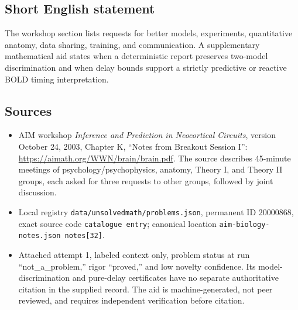 \documentclass[11pt]{article}
\begin{document}
\subsection{Short English statement}
The workshop section lists requests for better models, experiments, quantitative anatomy, data sharing, training, and communication. A supplementary mathematical aid states when a deterministic report preserves two-model discrimination and when delay bounds support a strictly predictive or reactive BOLD timing interpretation.
\subsection{Sources}
\begin{itemize}
\item AIM workshop \emph{Inference and Prediction in Neocortical Circuits}, version October 24, 2003, Chapter K, ``Notes from Breakout Session I'': \url{https://aimath.org/WWN/brain/brain.pdf}. The source describes 45-minute meetings of psychology/psychophysics, anatomy, Theory I, and Theory II groups, each asked for three requests to other groups, followed by joint discussion.
\item Local registry \texttt{data/unsolvedmath/problems.json}, permanent ID 20000868, exact source code \texttt{catalogue entry}; canonical location \texttt{aim-biology-notes.json notes[32]}.
\item Attached attempt 1, labeled context only, problem status at run ``not\_a\_problem,'' rigor ``proved,'' and low novelty confidence. Its model-discrimination and pure-delay certificates have no separate authoritative citation in the supplied record. The aid is machine-generated, not peer reviewed, and requires independent verification before citation.
\end{itemize}
\end{document}
